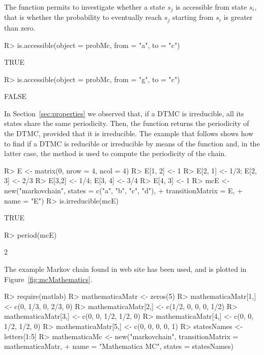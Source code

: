 \documentclass[nojss]{jss}
\begin{document}
The function  permits to investigate whether a state $s_{j}$ is accessible from state $s_i$, 
that is whether the probability to eventually reach $s_j$ starting from $s_{i}$ is greater than zero.

\begin{Schunk}
\begin{Sinput}
R> is.accessible(object = probMc, from = "a", to = "c")
\end{Sinput}
\begin{Soutput}
[1] TRUE
\end{Soutput}
\begin{Sinput}
R> is.accessible(object = probMc, from = "g", to = "c")
\end{Sinput}
\begin{Soutput}
[1] FALSE
\end{Soutput}
\end{Schunk}

In Section~\ref{sec:properties} we observed that, if a DTMC is
irreducible, all its states share the same periodicity. Then, the  function returns the periodicity of the DTMC, provided that it
is irreducible. The example that follows shows how to find if a DTMC is
reducible or irreducible by means of the function  and, in the latter case, the method  is used to compute the periodicity of the chain.


\begin{Schunk}
\begin{Sinput}
R> E <- matrix(0, nrow = 4, ncol = 4)
R> E[1, 2] <- 1
R> E[2, 1] <- 1/3; E[2, 3] <- 2/3
R> E[3,2] <- 1/4; E[3, 4] <- 3/4
R> E[4, 3] <- 1
R> mcE <- new("markovchain", states = c("a", "b", "c", "d"), 
+  		transitionMatrix = E, 
+  		name = "E")
R> is.irreducible(mcE)
\end{Sinput}
\begin{Soutput}
[1] TRUE
\end{Soutput}
\begin{Sinput}
R> period(mcE)
\end{Sinput}
\begin{Soutput}
[1] 2
\end{Soutput}
\end{Schunk}


The example Markov chain found in  web site \citep{mathematica9MarkovChain} has 
been used, and is plotted in Figure~\ref{fig:mcMathematics}.

\begin{Schunk}
\begin{Sinput}
R> require(matlab)
R> mathematicaMatr <- zeros(5)
R> mathematicaMatr[1,] <- c(0, 1/3, 0, 2/3, 0)
R> mathematicaMatr[2,] <- c(1/2, 0, 0, 0, 1/2)
R> mathematicaMatr[3,] <- c(0, 0, 1/2, 1/2, 0)
R> mathematicaMatr[4,] <- c(0, 0, 1/2, 1/2, 0)
R> mathematicaMatr[5,] <- c(0, 0, 0, 0, 1)
R> statesNames <- letters[1:5]
R> mathematicaMc <- new("markovchain", transitionMatrix = mathematicaMatr,
+                     name = "Mathematica MC", states = statesNames)
\end{Sinput}
\end{Schunk}
\end{document}
